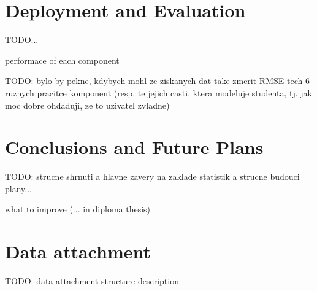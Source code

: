 \documentclass[a4paper, 12pt, twoside]{fithesis2}		%
\renewcommand{\_}{\leavevmode \kern0.0em\vbox{\hrule width0.4em}}
\begin{document}
\chapter{Deployment and Evaluation}
\label{chap:evaluation}

TODO...

performace of each component

TODO: bylo by pekne, kdybych mohl ze ziskanych dat take zmerit RMSE tech 6 ruznych pracitce komponent (resp. te jejich casti, ktera modeluje studenta, tj. jak moc dobre ohdaduji, ze to uzivatel zvladne)

\chapter{Conclusions and Future Plans}
\label{chap:future}

TODO: strucne shrnuti a hlavne zavery na zaklade statistik a strucne budouci plany...


what to improve (... in diploma thesis)





\appendix


\printbibliography

\chapter{Data attachment}

TODO: data attachment structure description
\end{document}
